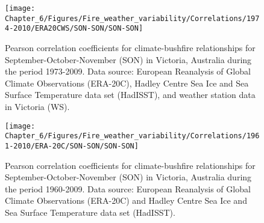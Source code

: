 \begin{figure}[h]
\noindent \begin{centering}
\texttt{[image: Chapter\_6/Figures/Fire\_weather\_variability/Correlations/1974-2010/ERA20CWS/SON-SON/SON-SON]}
\par\end{centering}

\caption[Pearson correlation coefficients for climate-bushfire relationships
for September-October-November (SON) in Victoria, Australia during
the period 1973-2009]{Pearson correlation coefficients for climate-bushfire relationships
for September-October-November (SON) in Victoria, Australia during
the period 1973-2009. Data source: European Reanalysis of Global Climate
Observations (ERA-20C), Hadley Centre Sea Ice and Sea Surface Temperature
data set (HadISST), and weather station data in Victoria (WS). \label{fig:Pearson correlation coefficients for climate-bushfire relationships for September-October-November in Victoria, Australia during the period 1973-2009 (r)}}
\end{figure}


\begin{figure}[h]
\noindent \begin{centering}
\texttt{[image: Chapter\_6/Figures/Fire\_weather\_variability/Correlations/1961-2010/ERA-20C/SON-SON/SON-SON]}
\par\end{centering}

\caption[Pearson correlation coefficients for climate-bushfire relationships
for September-October-November (SON) in Victoria, Australia during
the period 1960-2009]{Pearson correlation coefficients for climate-bushfire relationships
for September-October-November (SON) in Victoria, Australia during
the period 1960-2009. Data source: European Reanalysis of Global Climate
Observations (ERA-20C) and Hadley Centre Sea Ice and Sea Surface Temperature
data set (HadISST). \label{fig:Pearson correlation coefficients for climate-bushfire relationships for September-October-November in Victoria, Australia during the period 1960-2009 (r)}}
\end{figure}


